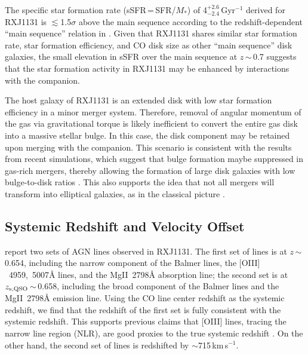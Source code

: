 \documentclass[]{emulateapj}
\newcommand{\mgii}{\mbox{Mg{\scriptsize II}~2798\AA}\xspace}
\newcommand{\oiii}{\mbox{$[$O{\scriptsize III}$]$~4959, 5007\AA}\xspace}
\newcommand{\kms}{\mbox{km\,s$^{-1}$}\xspace}
\newcommand{\pmOne}{\mbox{$^{-1}$}\xspace}
\newcommand{\petm}[2]{$^{+#1}_{-#2}$}
\newcommand{\eq}{\,=\,}
\newcommand{\ssim}{\,$\sim$\,}
\newcommand{\SF}{star formation\xspace}
\begin{document}
The specific star formation rate (sSFR\eq SFR/$M_*$) of 4\petm{2.6}{2.4}\,Gyr\pmOne derived for RXJ1131
is $\lesssim$1.5$\sigma$ above the main sequence according to
the redshift-dependent ``main sequence'' relation in \citet[and references therein]{Tacconi13a}.
Given that RXJ1131 shares similar \SF rate, \SF efficiency, and CO disk size as other ``main sequence'' disk galaxies,
the small elevation in sSFR over the main sequence at $z$\ssim0.7 suggests
that the \SF activity in RXJ1131 may be enhanced by interactions with the companion.























The host galaxy of RXJ1131 is an extended disk with low star formation efficiency in a minor merger
system. Therefore, removal of angular momentum of the gas via gravitational torque is likely inefficient to convert the
entire gas disk into a massive stellar bulge.
In this case, the disk component may be retained upon merging with the companion.
This scenario is consistent with the results from recent simulations, which suggest that bulge formation maybe
suppressed in gas-rich mergers, thereby allowing the formation of large disk galaxies with low bulge-to-disk ratios
\citep{Springel05a, Robertson06a, Hopkins09a}. This also supports the idea that not all mergers will transform into
elliptical galaxies, as in the classical picture \citep{Toomre72a}.


\subsection{Systemic Redshift and Velocity Offset}

\citet[]{Sluse07a} report two sets of AGN lines observed in RXJ1131.
The first set of lines is at $z$\ssim0.654, including the narrow component of the Balmer lines, the \oiii lines, and the \mgii absorption line; the second set is at
$z_{\rm s, QSO}$\ssim0.658, including the broad component of the Balmer lines and the \mgii emission line.
Using the CO line center redshift as the systemic redshift,
we find that the redshift of the first set is fully consistent with the systemic redshift. This
supports previous claims that [O{\scriptsize III}] lines, tracing the narrow line region (NLR),
are good proxies
to the true systemic redshift \citep[e.g.,][]{Vrtilek85a, Nelson00a}.
On the other hand, the second set of lines is redshifted by $\sim$715\,\kms.
\end{document}
